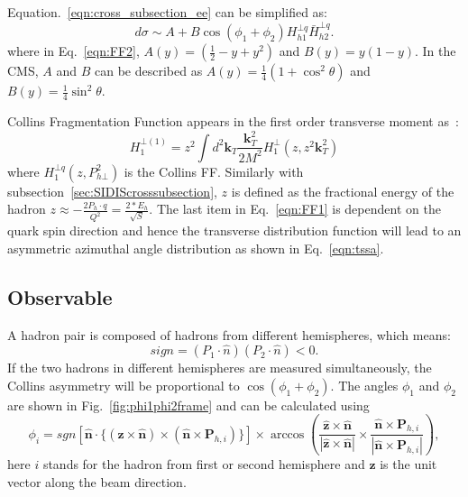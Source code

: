 Equation.~\ref{eqn:cross_subsection_ee} can be simplified as:
\begin{equation}
d\sigma \sim A+B\cos(\phi_1+\phi_2)H^{\bot q}_{h1}\bar{H}^{\bot q}_{h2}.
\label{eqn:FF2}
\end{equation}
\noindent where in Eq.~\eqref{eqn:FF2}, $A(y)=(\frac{1}{2}-y+y^2)$ and $B(y)=y(1-y)$. In the CMS, $A$ and $B$ can be described as $A(y)=\frac{1}{4}(1+\cos^2\theta)$ and $B(y)=\frac{1}{4}\sin^2\theta$. 

Collins Fragmentation Function appears in the first order transverse moment as~\cite{AsyInPolarizedHadronProductionInEE}:
\begin{equation}
H_1^{\bot(1)}=z^2\int d^2 \boldsymbol{k}_T \frac{\boldsymbol{k}_T^2}{2M^2} H_1^{\bot}(z,z^2\boldsymbol{k}_T^2)
\label{eqn:firstmomet}
\end{equation}
\noindent where $H^{\bot q}_1(z,P^2_{h\bot})$ is the Collins FF. Similarly with subsection~\ref{sec:SIDIScrosssubsection}, $z$ is defined as the fractional energy of the hadron $z\approx -\frac{2P_h\cdot q}{Q^2}=\frac{2*E_h}{\sqrt{S}}$. The last item in Eq.~\eqref{eqn:FF1} is dependent on the quark spin direction and hence the transverse distribution function will lead to an asymmetric azimuthal angle distribution as shown in Eq.~\eqref{eqn:tssa}.   

\subsection{Observable}
\label{sec:observable}
A hadron pair is composed of hadrons from different hemispheres, which means:
\begin{equation}
sign=(P_1 \cdot \hat{n})(P_2\cdot \hat{n}) < 0 .
\end{equation}
If the two hadrons in different hemispheres are measured simultaneously, the Collins asymmetry will be proportional to $\cos(\phi_1+\phi_2)$. The angles $\phi_1$ and $\phi_2$ are shown in Fig.~\ref{fig:phi1phi2frame} and can be calculated using
\begin{equation}
\phi_i=sgn[\hat{\boldsymbol{n}}\cdot \{ (\boldsymbol{z}\times\hat{\boldsymbol{n}})\times(\hat{\boldsymbol{n}}\times{\boldsymbol{P}_{h,i}})\}]\times \arccos(\frac{\hat{\boldsymbol{z}}\times\hat{\boldsymbol{n}}}{|\hat{\boldsymbol{z}}\times\hat{\boldsymbol{n}}|}\times\frac{\hat{\boldsymbol{n}}\times{\boldsymbol{P}_{h,i}}}{|\hat{\boldsymbol{n}}\times{\boldsymbol{P}_{h,i}}|}),
\label{eqn:collinsangledefine2}
\end{equation}
here $i$ stands for the hadron from first or second hemisphere and $\boldsymbol{z}$ is the unit vector along the beam direction.

